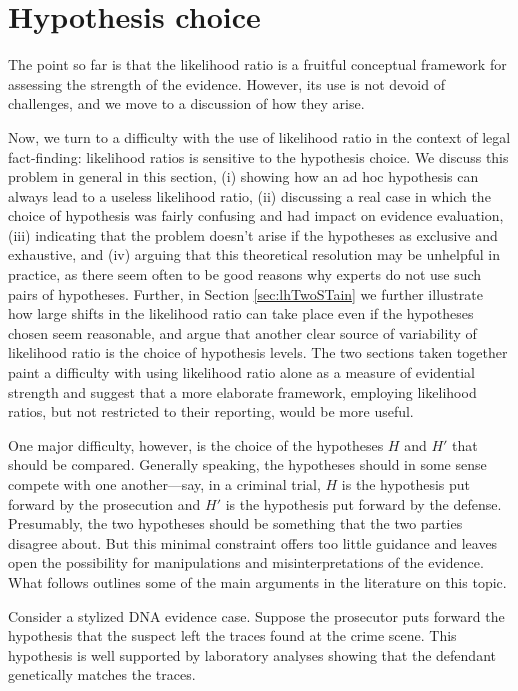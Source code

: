 \documentclass[
  10pt,
  dvipsnames,enabledeprecatedfontcommands]{scrartcl}
\begin{document}
\hypertarget{hypothesis-choice}{%
\section{\texorpdfstring{Hypothesis choice
\label{sec:hchoice}}{Hypothesis choice }}\label{hypothesis-choice}}

The point so far is that the likelihood ratio is a fruitful conceptual
framework for assessing the strength of the evidence. However, its use
is not devoid of challenges, and we move to a discussion of how they
arise.

Now, we turn to a difficulty with the use of likelihood ratio in the
context of legal fact-finding: likelihood ratios is sensitive to the
hypothesis choice. We discuss this problem in general in this section,
(i) showing how an ad hoc hypothesis can always lead to a useless
likelihood ratio, (ii) discussing a real case in which the choice of
hypothesis was fairly confusing and had impact on evidence evaluation,
(iii) indicating that the problem doesn't arise if the hypotheses as
exclusive and exhaustive, and (iv) arguing that this theoretical
resolution may be unhelpful in practice, as there seem often to be good
reasons why experts do not use such pairs of hypotheses. Further, in
Section \ref{sec:lhTwoSTain} we further illustrate how large shifts in
the likelihood ratio can take place even if the hypotheses chosen seem
reasonable, and argue that another clear source of variability of
likelihood ratio is the choice of hypothesis levels. The two sections
taken together paint a difficulty with using likelihood ratio alone as a
measure of evidential strength and suggest that a more elaborate
framework, employing likelihood ratios, but not restricted to their
reporting, would be more useful.

One major difficulty, however, is the choice of the hypotheses \(H\) and
\(H'\) that should be compared. Generally speaking, the hypotheses
should in some sense compete with one another---say, in a criminal
trial, \(H\) is the hypothesis put forward by the prosecution and \(H'\)
is the hypothesis put forward by the defense. Presumably, the two
hypotheses should be something that the two parties disagree about. But
this minimal constraint offers too little guidance and leaves open the
possibility for manipulations and misinterpretations of the evidence.
What follows outlines some of the main arguments in the literature on
this topic.

Consider a stylized DNA evidence case. Suppose the prosecutor puts
forward the hypothesis that the suspect left the traces found at the
crime scene. This hypothesis is well supported by laboratory analyses
showing that the defendant genetically matches the traces.
\end{document}
